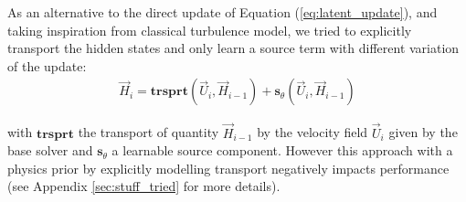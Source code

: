 As an alternative to the direct update of Equation (\ref{eq:latent_update}), and taking inspiration from classical turbulence model, we tried to explicitly transport the hidden states and only learn a source term with different variation of the update:
{\footnotesize
\begin{align}
    \vec{H}_{i} = \textbf{trsprt}\left(\vec{U}_i, \vec{H}_{i-1}\right) + \textbf{s}_{\theta} (\vec{U}_i, \vec{H}_{i-1} )
    \label{eq:latent_transport}
\end{align}
}

\noindent
with $\textbf{trsprt}$ the transport of quantity $\vec{H}_{i-1}$ by the velocity field $\vec{U}_i$ given by the base solver and $\textbf{s}_{\theta}$ a learnable source component. However this approach with a physics prior by explicitly modelling transport negatively impacts performance (see 
Appendix \ref{sec:stuff_tried} for more details).
